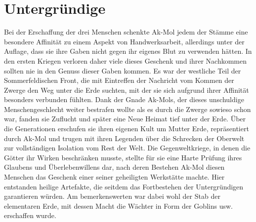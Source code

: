 \documentclass[a4paper,12pt,oneside]{book}
\begin{document}
\chapter{Untergründige}
Bei der Erschaffung der drei Menschen schenkte Ak-Mol jedem der Stämme eine besondere Affinität zu einem Aspekt von Handwerksarbeit, allerdings unter der Auflage, dass sie ihre Gaben nicht gegen ihr eigenes Blut zu verwenden hätten. In den ersten Kriegen verloren daher viele dieses Geschenk und ihrer Nachkommen sollten nie in den Genuss dieser Gaben kommen. Es war der westliche Teil der Sommerfeldischen Front, die mit Eintreffen der Nachricht vom Kommen der Zwerge den Weg unter die Erde suchten, mit der sie sich aufgrund ihrer Affinität besonders verbunden fühlten. Dank der Gnade Ak-Mols, der dieses unschuldige Menschengeschlecht weiter bestrafen wollte als es durch die Zwerge sowieso schon war, fanden sie Zuflucht und später eine Neue Heimat tief unter der Erde. Über die Generationen erschufen sie ihren eigenen Kult um Mutter Erde, repräsentiert durch Ak-Mol und trugen mit ihren Legenden über die Schrecken der Oberwelt zur vollständigen Isolation vom Rest der Welt. Die Gegenweltkriege, in denen die Götter ihr Wirken beschränken musste, stellte für sie eine Harte Prüfung ihres Glaubens und Überlebenwillens dar, nach deren Bestehen Ak-Mol diesen Menschen das Geschenk einer seiner geheiligten Werkstätte machte. Hier entstanden heilige Artefakte, die seitdem das Fortbestehen der Untergründigen garantieren würden. Am bemerkenswerten war dabei wohl der Stab der elementaren Erde, mit dessen Macht die Wächter in Form der Goblins usw. erschaffen wurde. 

\cleardoublepage
{}
{}
\printindex[Stichworte]
{}
\printindex[Geographie]
\end{document}
